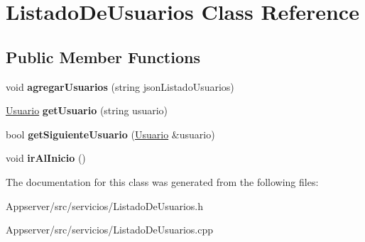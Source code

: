 \hypertarget{classListadoDeUsuarios}{}\section{Listado\+De\+Usuarios Class Reference}
\label{classListadoDeUsuarios}
\subsection*{Public Member Functions}
\begin{DoxyCompactItemize}
\item 
void {\bfseries agregar\+Usuarios} (string json\+Listado\+Usuarios)\hypertarget{classListadoDeUsuarios_a426d57efabeab51fa553cddd5511b9f2}{}\label{classListadoDeUsuarios_a426d57efabeab51fa553cddd5511b9f2}

\item 
\hyperlink{classUsuario}{Usuario} {\bfseries get\+Usuario} (string usuario)\hypertarget{classListadoDeUsuarios_a2dc55409255839bc618b15f2ac5a6f1a}{}\label{classListadoDeUsuarios_a2dc55409255839bc618b15f2ac5a6f1a}

\item 
bool {\bfseries get\+Siguiente\+Usuario} (\hyperlink{classUsuario}{Usuario} \&usuario)\hypertarget{classListadoDeUsuarios_ae83402c5fe88b6ecd136d3c96ea7f5ed}{}\label{classListadoDeUsuarios_ae83402c5fe88b6ecd136d3c96ea7f5ed}

\item 
void {\bfseries ir\+Al\+Inicio} ()\hypertarget{classListadoDeUsuarios_aa7329bf3e035dd251530744a601f9ece}{}\label{classListadoDeUsuarios_aa7329bf3e035dd251530744a601f9ece}

\end{DoxyCompactItemize}


The documentation for this class was generated from the following files\+:\begin{DoxyCompactItemize}
\item 
Appserver/src/servicios/Listado\+De\+Usuarios.\+h\item 
Appserver/src/servicios/Listado\+De\+Usuarios.\+cpp\end{DoxyCompactItemize}
